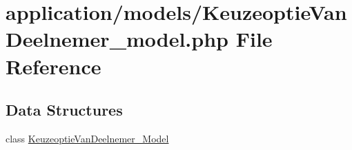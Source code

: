 \hypertarget{_keuzeoptie_van_deelnemer__model_8php}{}\section{application/models/\+Keuzeoptie\+Van\+Deelnemer\+\_\+model.php File Reference}
\label{_keuzeoptie_van_deelnemer__model_8php}
\subsection*{Data Structures}
\begin{DoxyCompactItemize}
\item 
class \mbox{\hyperlink{class_keuzeoptie_van_deelnemer___model}{Keuzeoptie\+Van\+Deelnemer\+\_\+\+Model}}
\end{DoxyCompactItemize}
